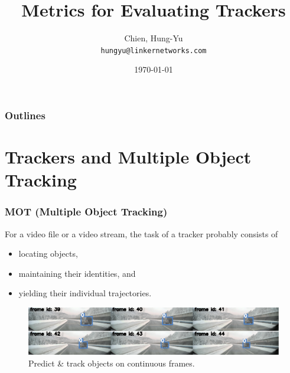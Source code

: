\documentclass[slidetop, mathserif]{beamer}
\title[Metrics for Tracking]{Metrics for Evaluating Trackers}
\author[chy1010]{Chien, Hung-Yu \\ {\small\tt hungyu@linkernetworks.com}}
\date{\today}
\begin{document}
\begin{frame}
	\titlepage
\end{frame}

\section[Outline]{}
\begin{frame}
	\frametitle{Outlines}
	\tableofcontents
\end{frame}


\section{Trackers and Multiple Object Tracking}

\begin{frame}
	\frametitle{MOT (Multiple Object Tracking)}

	For a video file or a video stream, the task of a tracker probably consists of
	\begin{itemize}
	\item locating objects,
	\item maintaining their identities, and
	\item yielding their individual trajectories.
	\end{itemize}

	\begin{figure}
		\includegraphics[width=1.05\textwidth]{pics/track01.png}
		\caption{Predict \& track objects on continuous frames.}
	\end{figure}

\end{frame}
\end{document}
